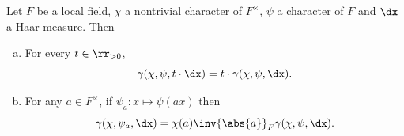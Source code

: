 \documentclass[11pt, x11names, openany]{book}
\begin{document}
\begin{prop}
\label{prop: gamma-factor dependency}
Let $F$ be a local field, $\chi$ a nontrivial character of $F^\times$, $\psi$ a character of $F$ and $\dx$ a Haar measure. Then
\begin{enumerate}[(a)]
    \item For every $t \in \rr_{> 0}$, 
    \begin{equation*}
        \gamma(\chi, \psi, t \cdot \dx) = t \cdot \gamma(\chi, \psi, \dx).
    \end{equation*}
    \item For any $a \in F^\times$, if $\psi_a: x \mapsto \psi(ax)$ then
    \begin{equation*}
        \gamma(\chi, \psi_a, \dx) = \chi(a) \inv{\abs{a}}_F \gamma(\chi, \psi, \dx).
    \end{equation*}
\end{enumerate}
\end{prop}
\end{document}
